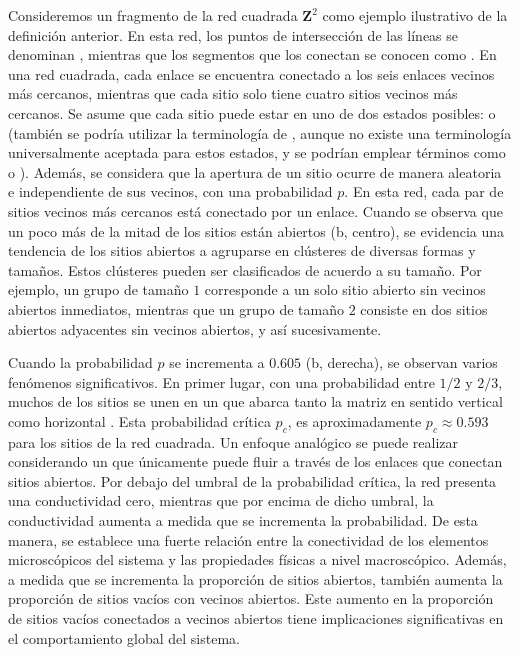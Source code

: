  Consideremos un fragmento de la red cuadrada  $\mathbf{Z}^2$ como ejemplo ilustrativo de la definición anterior. En esta red, los puntos de intersección de las líneas se denominan , mientras que los segmentos que los conectan se conocen como . En una red cuadrada, cada enlace se encuentra conectado a los seis enlaces vecinos más cercanos, mientras que cada sitio solo tiene cuatro sitios vecinos más cercanos. Se asume que cada sitio puede estar en uno de dos estados posibles:  o  (también se podría utilizar la terminología de , aunque no existe una terminología universalmente aceptada para estos estados, y se podrían emplear términos como  o ). Además, se considera que la apertura de un sitio ocurre de manera aleatoria e independiente de sus vecinos, con una probabilidad $p$. En esta red, cada par de sitios vecinos más cercanos está conectado por un enlace. Cuando se observa que un poco más de la mitad de los sitios están abiertos (b, centro), se evidencia una tendencia de los sitios abiertos a agruparse en clústeres de diversas formas y tamaños. Estos clústeres pueden ser clasificados de acuerdo a su tamaño. Por ejemplo, un grupo de tamaño $1$ corresponde a un solo sitio abierto sin vecinos abiertos inmediatos, mientras que un grupo de tamaño $2$ consiste en dos sitios abiertos adyacentes sin vecinos abiertos, y así sucesivamente.
 
 
 
 Cuando la probabilidad $p$ se incrementa a $0.605$ (b, derecha), se observan varios fenómenos significativos. 
 En primer lugar, con una probabilidad entre $1/2$ y $2/3$, muchos de los sitios se unen en un  que abarca tanto la matriz en sentido vertical como horizontal . Esta probabilidad crítica $p_c$, es aproximadamente $p_c \approx 0.593$  para los sitios de la red cuadrada. Un enfoque analógico se puede realizar considerando un  que únicamente puede fluir a través de los enlaces que conectan sitios abiertos. Por debajo del umbral de la probabilidad crítica, la red presenta una conductividad cero, mientras que por encima de dicho umbral, la conductividad aumenta a medida que se incrementa la probabilidad. De esta manera, se establece una fuerte relación entre la conectividad de los elementos microscópicos del sistema y las propiedades físicas a nivel macroscópico. Además, a medida que se incrementa la proporción de sitios abiertos, también aumenta la proporción de sitios vacíos con vecinos abiertos. Este aumento en la proporción de sitios vacíos conectados a vecinos abiertos tiene implicaciones significativas en el comportamiento global del sistema.
 
